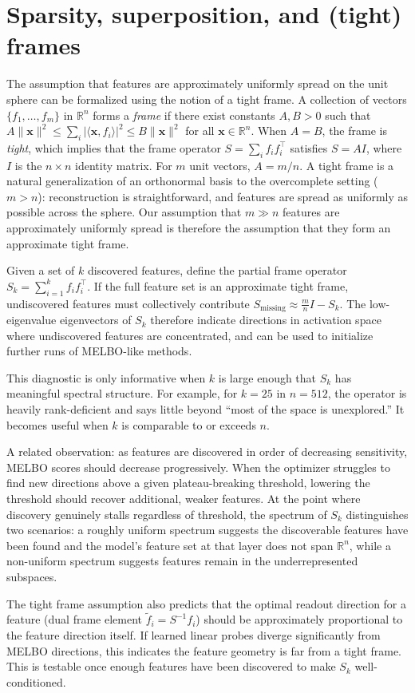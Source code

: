 \documentclass[11pt]{article}
\begin{document}
\section{Sparsity, superposition, and (tight) frames}
The assumption that features are approximately uniformly spread on the unit sphere can be formalized using the notion of a tight frame.
A collection of vectors $\{f_1, \ldots, f_m\}$ in $\mathbb{R}^n$ forms a \emph{frame} if there exist constants $A, B > 0$ such that $A \|\mathbf{x}\|^2 \leq \sum_i |\langle \mathbf{x}, f_i \rangle|^2 \leq B \|\mathbf{x}\|^2$ for all $\mathbf{x} \in \mathbb{R}^n$.
When $A = B$, the frame is \emph{tight}, which implies that the frame operator $S = \sum_i f_i f_i^\top$ satisfies $S = A I$, where $I$ is the $n \times n$ identity matrix.
For $m$ unit vectors, $A = m/n$.
A tight frame is a natural generalization of an orthonormal basis to the overcomplete setting ($m > n$): reconstruction is straightforward, and features are spread as uniformly as possible across the sphere.
Our assumption that $m \gg n$ features are approximately uniformly spread is therefore the assumption that they form an approximate tight frame.

Given a set of $k$ discovered features, define the partial frame operator $S_k = \sum_{i=1}^k f_i f_i^\top$. If the full feature set is an approximate tight frame, undiscovered features must collectively contribute $S_{\mathrm{missing}} \approx \frac{m}{n} I - S_k$. The low-eigenvalue eigenvectors of $S_k$ therefore indicate directions in activation space where undiscovered features are concentrated, and can be used to initialize further runs of MELBO-like methods.

This diagnostic is only informative when $k$ is large enough that $S_k$ has meaningful spectral structure.
For example, for $k = 25$ in $n = 512$, the operator is heavily rank-deficient and says little beyond ``most of the space is unexplored.'' It becomes useful when $k$ is comparable to or exceeds $n$.

A related observation: as features are discovered in order of decreasing sensitivity, MELBO scores should decrease progressively.
When the optimizer struggles to find new directions above a given plateau-breaking threshold, lowering the threshold should recover additional, weaker features.
At the point where discovery genuinely stalls regardless of threshold, the spectrum of $S_k$ distinguishes two scenarios: a roughly uniform spectrum suggests the discoverable features have been found and the model's feature set at that layer does not span $\mathbb{R}^n$, while a non-uniform spectrum suggests features remain in the underrepresented subspaces.

The tight frame assumption also predicts that the optimal readout direction for a feature (dual frame element $\tilde{f}_i = S^{-1} f_i$) should be approximately proportional to the feature direction itself.
If learned linear probes diverge significantly from MELBO directions, this indicates the feature geometry is far from a tight frame.
This is testable once enough features have been discovered to make $S_k$ well-conditioned.
\end{document}
